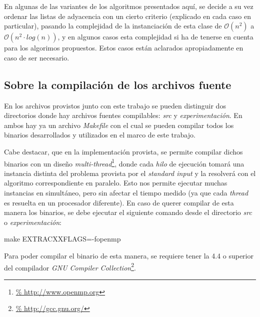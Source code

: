 \par En algunas de las variantes de los algoritmos presentados aqu\'i, se decide
    a su vez ordenar las listas de adyacencia con un cierto criterio (explicado
    en cada caso en particular), pasando la complejidad de la instanciaci\'on
    de esta clase de $\mathcal O(n^2)$ a $\mathcal O(n^2 \cdot log(n))$, y
    en algunos casos esta complejidad si ha de tenerse en cuenta para los algorimos
    propuestos. Estos casos est\'an aclarados apropiadamente en caso de ser
    necesario.

{}
\subsection*{Sobre la compilaci\'on de los archivos fuente}
\par En los archivos provistos junto con este trabajo se pueden distinguir dos
    directorios donde hay archivos fuentes compilables: \emph{src} y
    \emph{experimentaci\'on}. En ambos hay ya un archivo \emph{Makefile} con el
    cual se pueden compilar todos los binarios desarrollados y utilizados en
    el marco de este trabajo.

\par Cabe destacar, que en la implementaci\'on provista, se permite compilar
    dichos binarios con un dise\~no \emph{multi-thread}\footnote{\url{%
    http://www.openmp.org}}, donde cada \emph{hilo} de ejecuci\'on tomar\'a
    una instancia distinta del problema provista por el \emph{standard input}
    y la resolver\'a con el algoritmo correspondiente en paralelo. Esto nos
    permite ejecutar muchas instancias en simult\'aneo, pero sin afectar
    el tiempo medido (ya que cada \emph{thread} es resuelta en un procesador
    diferente). En caso de querer compilar de esta manera los binarios, se
    debe ejecutar el siguiente comando desde el directorio \emph{src} o
    \emph{experimentaci\'on}:

\bigskip
\par make EXTRACXXFLAGS=-fopenmp
\bigskip

\par Para poder compilar el binario de esta manera, se requiere tener la 4.4
    o superior del compilador \emph{GNU Compiler Collection}\footnote{\url{%
    http://gcc.gnu.org/}}.

{}
